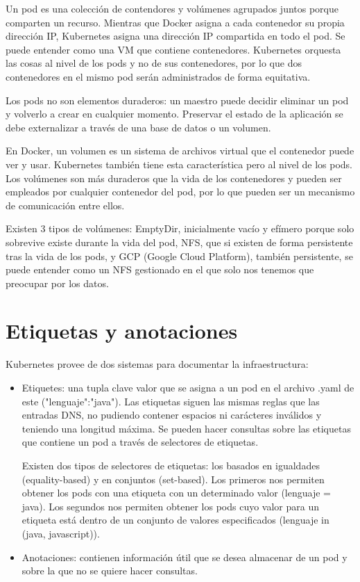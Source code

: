 \documentclass[11pt,a4paper]{article}
\begin{document}
Un pod es una colección de contendores y volúmenes agrupados juntos porque comparten un recurso. Mientras que Docker asigna a cada contenedor su propia dirección IP, Kubernetes asigna una dirección IP compartida en todo el pod. Se puede entender como una VM que contiene contenedores. Kubernetes orquesta las cosas al nivel de los pods y no de sus contenedores, por lo que dos contenedores en el mismo pod serán administrados de forma equitativa.

Los pods no son elementos duraderos: un maestro puede decidir eliminar un pod y volverlo a crear en cualquier momento. Preservar el estado de la aplicación se debe externalizar a través de una base de datos o un volumen.

En Docker, un volumen es un sistema de archivos virtual que el contenedor puede ver y usar. Kubernetes también tiene esta característica pero al nivel de los pods. Los volúmenes son más duraderos que la vida de los contenedores y pueden ser empleados por cualquier contenedor del pod, por lo que pueden ser un mecanismo de comunicación entre ellos.

Existen 3 tipos de volúmenes: EmptyDir, inicialmente vacío y efímero porque solo sobrevive existe durante la vida del pod, NFS, que si existen de forma persistente tras la vida de los pods, y GCP (Google Cloud Platform), también persistente, se puede entender como un NFS gestionado en el que solo nos tenemos que preocupar por los datos.

\section{Etiquetas y anotaciones}

Kubernetes provee de dos sistemas para documentar la infraestructura:

\begin{itemize}

\item Etiquetes: una tupla clave valor que se asigna a un pod en el archivo .yaml de este ("lenguaje":"java"). Las etiquetas siguen las mismas reglas que las entradas DNS, no pudiendo contener espacios ni carácteres inválidos y teniendo una longitud máxima. Se pueden hacer consultas sobre las etiquetas que contiene un pod a través de selectores de etiquetas.

Existen dos tipos de selectores de etiquetas: los basados en igualdades (equality-based) y en conjuntos (set-based). Los primeros nos permiten obtener los pods con una etiqueta con un determinado valor (lenguaje = java). Los segundos nos permiten obtener los pods cuyo valor para un etiqueta está dentro de un conjunto de valores especificados (lenguaje in (java, javascript)).

\item Anotaciones: contienen información útil que se desea almacenar de un pod y sobre la que no se quiere hacer consultas.

\end{itemize}
\end{document}
